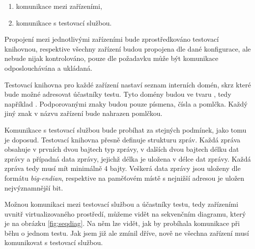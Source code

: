 \begin{enumerate}
    \item komunikace mezi zařízeními,
    \item komunikace s testovací službou.
\end{enumerate}

Propojení mezi jednotlivými zařízeními bude zprostředkováno testovací knihovnou, respektive všechny zařízení budou propojena dle dané konfigurace, ale nebude nijak kontrolováno, pouze dle požadavku může být komunikace odposlouchávána a ukládaná. 

Testovací knihovna pro každé zařízení nastaví seznam interních domén, skrz které bude možné adresovat účastníky testu. Tyto domény budou ve tvaru , tedy například . Podporovanými znaky budou pouze písmena, čísla a pomlčka. Každý jiný znak v názvu zařízení bude nahrazen pomlčkou. 

Komunikace s testovací službou bude probíhat za stejných podmínek, jako tomu je doposud. Testovací knihovna přesně definuje strukturu zpráv. Každá zpráva obsahuje v prvních dvou bajtech typ zprávy, v dalších dvou bajtech délku dat zprávy a případná data zprávy, jejichž délka je uložena v délce dat zprávy. Každá zpráva tedy musí mít minimálně 4 bajty. Veškerá data zprávy jsou uloženy dle formátu \textit{big-endian}, respektive na paměťovém místě s nejnižší adresou je uložen nejvýznamnější bit.

Možnou komunikaci mezi testovací službou a účastníky testu, tedy zařízeními uvnitř virtualizovaného prostředí, můžeme vidět na sekvenčním diagramu, který je na obrázku \ref{fig:seqdiag}. Na něm lze vidět, jak by probíhala komunikace při běhu o jednom testu. Jak jsem již ale zmínil dříve, nově ne všechna zařízení musí komunikovat s testovací službou. 

